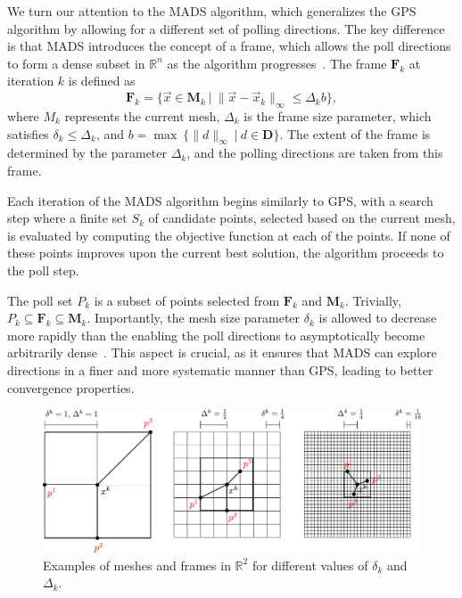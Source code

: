 We turn our attention to the MADS algorithm, which generalizes the GPS algorithm by allowing for a different set of polling directions. The key difference is that MADS introduces the concept of a frame, which allows the poll directions to form a dense subset in $ \mathbb{R}^{n} $ as the algorithm progresses~\cite{BBO-textbook, derivative-free-review}. The frame $\mathbf{F}_k$ at iteration $k$ is defined as
\begin{equation}
	\mathbf{F}_k = \{ \vec{x} \in \mathbf{M}_k \ \big| \ \| \vec{x} - \vec{x}_k \|_\infty \leq \Delta_k b \},
\end{equation}
where $M_k$ represents the current mesh, $ \Delta_k $ is the frame size parameter, which satisfies $ \delta_k \leq \Delta_k $, and $b = \max \ \{ \| d \| _\infty \ \big| \ d \in \mathbf{D} \}$. The extent of the frame is determined by the parameter $ \Delta_k $, and the polling directions are taken from this frame.

Each iteration of the MADS algorithm begins similarly to GPS, with a search step where a finite set $S_k$ of candidate points, selected based on the current mesh, is evaluated by computing the objective function at each of the points. If none of these points improves upon the current best solution, the algorithm proceeds to the poll step. 
 
The poll set $P_k$ is a subset of points selected from $\mathbf{F}_k$ and $\mathbf{M}_k$. Trivially, $P_k \subseteq \mathbf{F}_k \subseteq \mathbf{M}_k$. Importantly, the mesh size parameter $ \delta_k $ is allowed to decrease more rapidly than the  enabling the poll directions to asymptotically become arbitrarily dense~\cite{Audet2006}. This aspect is crucial, as it ensures that MADS can explore directions in a finer and more systematic manner than GPS, leading to better convergence properties.


\begin{figure}[H]
	\centering
	\vspace{0.2cm}
	\includegraphics[width=1.0\textwidth]{figures/mads.pdf}
	\caption{Examples of meshes and frames in $\mathbb{R}^2$ for different
		values of $\delta_k$ and $\Delta_k$.}
	\label{fig:mads}
\end{figure}

